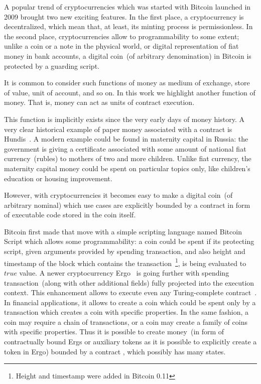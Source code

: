 \documentclass[]{llncs}   %
\begin{document}
A popular trend of cryptocurrencies which was started with Bitcoin launched in 2009 brought two new exciting features.
In the first place, a cryptocurrency is decentralized, which mean that, at least, its minting process is permissionless.
In the second place, cryptocurrencies allow to programmability to some extent; unlike a coin or a note in the physical
world, or digital representation of fiat money in bank accounts, a digital coin~(of arbitrary denomination) in Bitcoin
is protected by a guarding script.

It is common to consider such functions of money as medium of exchange, store of value, unit of account, and so on.
In this work we highlight another function of money. That is, money can act as units of contract execution.

This function is implicitly exists since the very early days of money history. A very clear historical example of paper money associated with a contract is Hundis~\cite{???}. A modern example could be found in
maternity capital in Russia: the government is giving a certificate associated with some amount of national fiat currency~(rubles)
to mothers of two and more children. Unlike fiat currency, the maternity capital money could be spent on particular
topics only, like children's education or housing improvement.

However, with cryptocurrencies it becomes easy to make a digital coin~(of arbitrary nominal) which use cases are
explicitly bounded by a contract in form of executable code stored in the coin itself.

Bitcoin first made that move with a simple
scripting language named Bitcoin Script which allows some programmability: a coin could be spent if its protecting script,
given arguments provided by spending transaction, and also height and timestamp of the block which contains the
transaction~\footnote{Height and timestamp were added in Bitcoin 0.11},
is being evaluated to $true$ value. A newer cryptocurrency Ergo~\cite{ergowp} is going further with spending transaction~(along with other additional
fields) fully projected into the execution context. This enhancement allows to execute even any Turing-complete
contract~\cite{chepurnoy2018self}. In financial applications, it allows to create a coin which could be spent only by
a transaction which creates a coin with specific properties. In the same fashion, a coin may require a chain of
transactions, or a coin may create a family of coins with specific properties. Thus it is possible to create money~(in
form of contractually bound Ergs or auxiliary tokens as it is possible to explicitly create a token in Ergo) bounded by a contract 
, which possibly has many states. 
\end{document}
